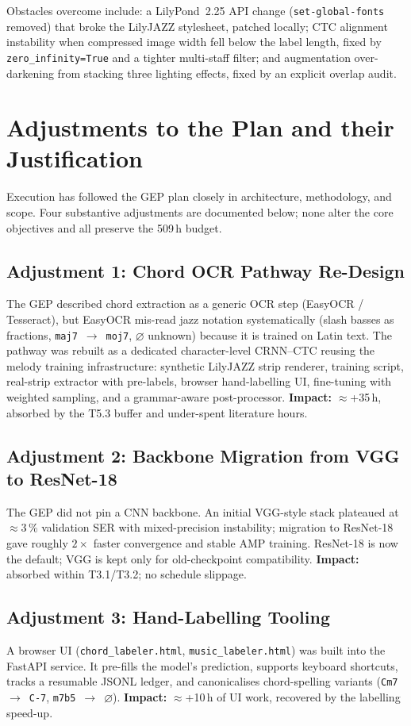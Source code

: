 \documentclass[11pt, a4paper]{article}
\begin{document}
Obstacles overcome include: a LilyPond~2.25 API change (\texttt{set-global-fonts} removed) that broke the LilyJAZZ stylesheet, patched locally; CTC alignment instability when compressed image width fell below the label length, fixed by \texttt{zero\_infinity=True} and a tighter multi-staff filter; and augmentation over-darkening from stacking three lighting effects, fixed by an explicit overlap audit.

\section{Adjustments to the Plan and their Justification}
\label{sec:adjustments}

Execution has followed the GEP plan closely in architecture, methodology, and scope. Four substantive adjustments are documented below; none alter the core objectives and all preserve the 509\,h budget.

\subsection{Adjustment 1: Chord OCR Pathway Re-Design}
The GEP described chord extraction as a generic OCR step (EasyOCR / Tesseract), but EasyOCR mis-read jazz notation systematically (slash basses as fractions, \texttt{maj7}~$\rightarrow$~\texttt{moj7}, \texttt{$\varnothing$} unknown) because it is trained on Latin text. The pathway was rebuilt as a dedicated character-level CRNN--CTC reusing the melody training infrastructure: synthetic LilyJAZZ strip renderer, training script, real-strip extractor with pre-labels, browser hand-labelling UI, fine-tuning with weighted sampling, and a grammar-aware post-processor. \textbf{Impact:} $\approx$+35\,h, absorbed by the T5.3 buffer and under-spent literature hours.

\subsection{Adjustment 2: Backbone Migration from VGG to ResNet-18}
The GEP did not pin a CNN backbone. An initial VGG-style stack plateaued at $\approx$3\,\% validation SER with mixed-precision instability; migration to ResNet-18 gave roughly $2\times$ faster convergence and stable AMP training. ResNet-18 is now the default; VGG is kept only for old-checkpoint compatibility. \textbf{Impact:} absorbed within T3.1/T3.2; no schedule slippage.

\subsection{Adjustment 3: Hand-Labelling Tooling}
A browser UI (\texttt{chord\_labeler.html}, \texttt{music\_labeler.html}) was built into the FastAPI service. It pre-fills the model's prediction, supports keyboard shortcuts, tracks a resumable JSONL ledger, and canonicalises chord-spelling variants (\texttt{Cm7}~$\rightarrow$~\texttt{C-7}, \texttt{m7b5}~$\rightarrow$~\texttt{$\varnothing$}). \textbf{Impact:} $\approx$+10\,h of UI work, recovered by the labelling speed-up.
\end{document}
